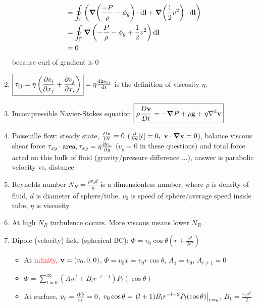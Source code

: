 \documentclass{article}
\theoremstyle{remark}
\theoremstyle{remark}
\begin{document}
\begin{enumerate}
\begin{align*}
                &= \oint_\Gamma\left(\grad(\frac{-P}{\rho}-\phi_g)\cdot\dd\vb{l}+\grad(\frac{1}{2}v^2)\cdot\dd\vb{l}\right)\\
                &= \oint_\Gamma\grad\left(-\frac{P}{\rho}-\phi_g+\frac{1}{2}v^2\right)\dd\vb{l}\\
                &= 0
    \end{align*}because curl of gradient is 0
    \item $\boxed{\tau_{ij}=\eta\left(\pdv{v_i}{x_j}+\pdv{v_j}{x_i}\right)}=\eta\dv{2e_{ij}}{t}$ is the definition of viscosity $\eta$.
    \item Incompressible Navier-Stokes equation $\boxed{\rho\frac{D\vb{v}}{D t}=-\grad P+\rho\vb{g}+\eta\laplacian{\vb{v}}}$
    \item Poiseuille flow: steady state, $\frac{D\vb{v}}{Dt}=0$ ($\pdv{\vb{v}}[t]=0,\ \vb{v}\cdot\grad{\vb{v}}=0$), balance viscous shear force $\tau_{xy}\cdot\mathrm{area},\tau_{xy}=\eta\pdv{v_x}{y}$ ($v_y=0$ in these questions) and total force acted on this bulk of fluid (gravity/pressure difference ...), answer is parabolic velocity vs. distance
    \item Reynolds number $N_R=\frac{\rho v_0 d}{\eta}$ is a dimensionless number, where $\rho$ is density of fluid, $d$ is diameter of sphere/tube, $v_0$ is speed of sphere/average speed inside tube, $\eta$ is viscosity
    \item At high $N_R$ turbulence occurs. More viscous means lower $N_R$.
    \item Dipole (velocity) field (spherical BC): $\boxed{\Phi=v_0\cos\theta\left(r+\frac{a^3}{2r^2}\right)}$\begin{itemize}
            \item At \textcolor{red}{infinity, $\vb{v}=(v_0,0,0)$}, $\Phi=v_0x=v_0r\cos\theta$, $A_1=v_0$, $A_{i\neq 1}=0$
            \item $\Phi=\sum_{l=0}^\infty (A_l r^l+B_l r^{-l-1})P_l(\cos\theta)$
            \item At surface, $v_r=\dv{\Phi}{r}=0$, $v_0\cos\theta=\eval{(l+1)B_l r^{-l-2}P_l(\cos\theta)}_{r=a}$, $B_1=\frac{v_0a^3}{2}$
        \end{itemize}
\end{enumerate}


    
\end{document}
